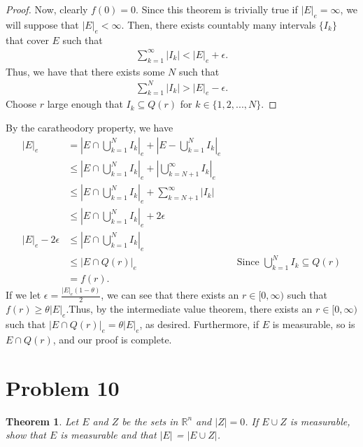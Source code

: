 \documentclass[10pt,a4paper]{article}
\theoremstyle{theorem}
\newtheorem{theorem}{Theorem}
\theoremstyle{definition}
\begin{document}
\begin{proof}
Now, clearly $f(0) = 0$. Since this theorem is trivially true if $|E|_e = \infty$, we will suppose that $|E|_e < \infty$. Then, there exists countably many intervals $\{I_k\}$ that cover $E$ such that
\begin{align*}
\sum_{k=1}^\infty |I_k| < |E|_e + \epsilon.
\end{align*}
Thus, we have that there exists some $N$ such that 
\begin{align*}
\sum_{k=1}^N |I_k| > |E|_e - \epsilon.
\end{align*}
Choose $r$ large enough that $I_k \subseteq Q(r)$ for $k \in \{1, 2, ..., N\}$.
\end{proof}
By the caratheodory property, we have
\begin{align*}
|E|_e &= |E \cap \bigcup_{k=1}^N I_k|_e + |E - \bigcup_{k=1}^N I_k |_e\\
&\leq |E \cap \bigcup_{k=1}^N I_k|_e + |\bigcup_{k=N+1}^\infty I_k |_e\\
&\leq |E \cap \bigcup_{k=1}^N I_k|_e + \sum_{k=N+1}^\infty |I_k|\\
&\leq |E \cap \bigcup_{k=1}^N I_k|_e + 2 \epsilon\\
|E|_e - 2 \epsilon &\leq |E \cap \bigcup_{k=1}^N I_k|_e\\
&\leq |E \cap Q(r)|_e &&\text{Since } \bigcup_{k=1}^N I_k \subseteq Q(r)\\
&= f(r).
\end{align*}
If we let $\epsilon = \frac{|E|_e(1 - \theta)}{2}$, we can see that there exists an $r \in [0, \infty)$ such that $f(r) \geq \theta |E|_e$.Thus, by the intermediate value theorem, there exists an $r \in [0, \infty)$ such that $|E \cap Q(r)|_e = \theta |E|_e$, as desired. Furthermore, if $E$ is measurable, so is $E \cap Q(r)$, and our proof is complete.

\section*{Problem 10}
\begin{theorem}
Let $E$ and $Z$ be the sets in $\mathbb{R}^n$ and $|Z| = 0$. If $E \cup Z$ is measurable, show that $E$ is measurable and that $|E|$ = $|E \cup Z|$.
\end{theorem}
\end{document}
